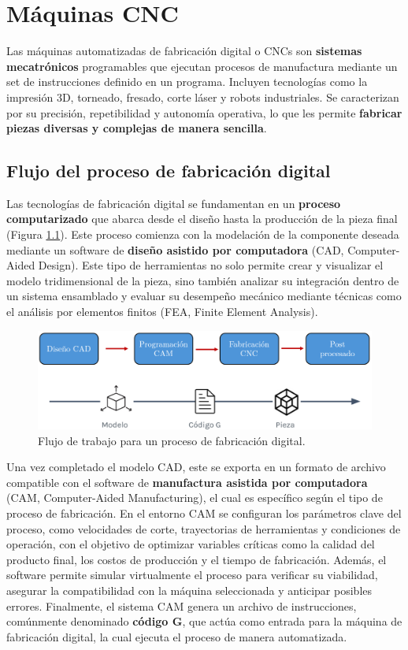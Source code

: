 \chapter{Máquinas CNC}

Las máquinas automatizadas de fabricación digital o CNCs son \textbf{sistemas mecatrónicos} programables que ejecutan procesos de manufactura mediante un set de instrucciones definido en un programa. Incluyen tecnologías como la impresión 3D, torneado, fresado, corte láser y robots industriales. Se caracterizan por su precisión, repetibilidad y autonomía operativa, lo que les permite \textbf{fabricar piezas diversas y complejas de manera sencilla}.

\section{Flujo del proceso de fabricación digital}

Las tecnologías de fabricación digital se fundamentan en un \textbf{proceso computarizado} que abarca desde el diseño hasta la producción de la pieza final (Figura \ref{digfab}). Este proceso comienza con la modelación de la componente deseada mediante un software de \textbf{diseño asistido por computadora} (CAD, Computer-Aided Design). Este tipo de herramientas no solo permite crear y visualizar el modelo tridimensional de la pieza, sino también analizar su integración dentro de un sistema ensamblado y evaluar su desempeño mecánico mediante técnicas como el análisis por elementos finitos (FEA, Finite Element Analysis).

\begin{figure}[h!]
    \centering
    \includegraphics[width=0.9\linewidth]{imgs/digfab.png}
    \caption{Flujo de trabajo para un proceso de fabricación digital.}
    \label{digfab}
\end{figure}

Una vez completado el modelo CAD, este se exporta en un formato de archivo compatible con el software de \textbf{manufactura asistida por computadora} (CAM, Computer-Aided Manufacturing), el cual es específico según el tipo de proceso de fabricación. En el entorno CAM se configuran los parámetros clave del proceso, como velocidades de corte, trayectorias de herramientas y condiciones de operación, con el objetivo de optimizar variables críticas como la calidad del producto final, los costos de producción y el tiempo de fabricación. Además, el software permite simular virtualmente el proceso para verificar su viabilidad, asegurar la compatibilidad con la máquina seleccionada y anticipar posibles errores. Finalmente, el sistema CAM genera un archivo de instrucciones, comúnmente denominado \textbf{código G}, que actúa como entrada para la máquina de fabricación digital, la cual ejecuta el proceso de manera automatizada.

